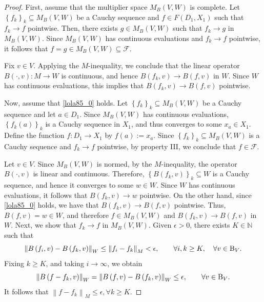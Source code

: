 \documentclass[14pt, a4paper]{article}  %
\newcounter{property}
\providecommand{\llave}[1]{\left\lbrace #1\right\rbrace }
\providecommand{\pare}[1]{\left( #1\right) }
\providecommand{\norm}[1]{\left\lVert#1\right\rVert}
\newcommand{\tien}{\rightarrow}
\newcommand{\mw}{M}
\newcommand{\N}{\mathbb{N}}
\newcommand{\B}{\textup{B}}
\newcommand{\F}{\mathcal{F}}
\begin{document}
\begin{proof} 
	First, assume that the multiplier space $M_{B}\pare{V,W}$ is complete. Let $\llave{f_{k}}_{k}\subseteq M_{B}\pare{V,W}$ be a Cauchy sequence and $f\in F\pare{D_{1},X_{1}}$ such that $f_{k}\tien f$ pointwise. Then, there exists $g\in M_{B}\pare{V,W}$ such that  $f_{k}\tien g$ in $M_{B}\pare{V,W}$. Since   $M_{B}\pare{V,W}$ has continuous evaluations and $f_{k}\tien f$ pointwise, it follows that $f=g\in M_{B}\pare{V,W}\subseteq \F$.
 	 
 	  Fix $v\in V$. Applying the $M$-inequality, we conclude that the linear operator $B\pare{\cdot,v}:M\tien W$ is continuous, and hence $B\pare{f_{k},v}\tien B\pare{f,v}$ in $W$. Since $W$ has continuous evaluations, this implies that $B\pare{f_{k},v} \tien B\pare{f,v}$ pointwise.
	
	Now, assume that \ref{lola85_0}  holds.	Let  $\llave{f_{k}}_{k}\subseteq  M_{B}\pare{V,W}$ be a Cauchy sequence and let $a\in D_{1}$. Since    $M_{B}\pare{V,W}$ has continuous evaluations,   $\llave{f_{k}\pare{a}}_{k}$ is a Cauchy sequence in $X_{1}$, and thus converges to some $x_{a}\in X_{1}$. 	Define the function $f:D_{1}\tien X_{1}$ by  $f\pare{a}:=x_{a}.$ 
	Since  $\llave{f_{k}}_{k}\subseteq M_{B}\pare{V,W}$ is a Cauchy sequence and $f_{k}\tien f$ pointwise, by property  III, we conclude that $f\in \F$.
	
		Let  $v\in V$. Since  $M_{B}\pare{V,W}$ is normed, by the $M$-inequality, the operator $B\pare{\cdot,v}$ is linear and continuous. Therefore, $\llave{B\pare{f_{k},v}}_{k}\subseteq W$ is a Cauchy  sequence, and hence it converges to some $w\in W$. Since $W$ has continuous evaluations, it follows that $B\pare{f_{k},v} \tien w$ pointwise. On the other hand, since \ref{lola85_0} holds, we have that $B\pare{f_{k},v}\tien B\pare{f,v}$ pointwise. Thus,   $B\pare{f,v}=w\in W$, and therefore $f\in M_{B}\pare{V,W}$ and $B\pare{f_{k},v}\tien B\pare{f,v}$ in $W$. 	Next, we show that $f_{k}\tien f$ in $M_{B}\pare{V,W}$. Given  $\epsilon>0$, there exists $K\in \N$ such that
	\begin{equation}
	\norm{B\pare{f_{i},v}-B\pare{f_{k},v}}_{W}\leq\norm{f_{i}-f_{k}}_{\mw}<\epsilon,\qquad \forall i,k\geq K,\quad \forall v\in \B_{V}.
	\end{equation}
	Fixing  $k\geq K$, and taking $i\tien \infty$, we obtain 
	\begin{equation}
	\norm{B\pare{f-f_{k},v}}_{W}=\norm{B\pare{f,v}-B\pare{f_{k},v}}_{W}\leq\epsilon,\qquad   \forall v\in \B_{V}.
	\end{equation}
	It follows that $\norm{f-f_{k}}_{\mw}\leq \epsilon,\forall k\geq K$.  
\end{proof}
\end{document}
